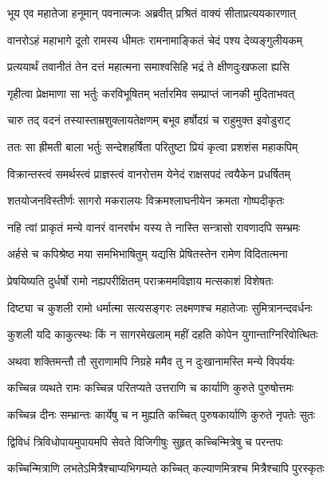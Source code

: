 
\twolineshloka
{भूय एव महातेजा हनूमान् पवनात्मजः}
{अब्रवीत् प्रश्रितं वाक्यं सीताप्रत्ययकारणात्} %

\twolineshloka
{वानरोऽहं महाभागे दूतो रामस्य धीमतः}
{रामनामाङ्कितं चेदं पश्य देव्यङ्गुलीयकम्} %

\twolineshloka
{प्रत्ययार्थं तवानीतं तेन दत्तं महात्मना}
{समाश्वसिहि भद्रं ते क्षीणदुःखफला ह्यसि} %

\twolineshloka
{गृहीत्वा प्रेक्षमाणा सा भर्तुः करविभूषितम्}
{भर्तारमिव सम्प्राप्तं जानकी मुदिताभवत्} %

\twolineshloka
{चारु तद् वदनं तस्यास्ताम्रशुक्लायतेक्षणम्}
{बभूव हर्षोदग्रं च राहुमुक्त इवोडुराट्} %

\twolineshloka
{ततः सा ह्रीमती बाला भर्तुः सन्देशहर्षिता}
{परितुष्टा प्रियं कृत्वा प्रशशंस महाकपिम्} %

\twolineshloka
{विक्रान्तस्त्वं समर्थस्त्वं प्राज्ञस्त्वं वानरोत्तम}
{येनेदं राक्षसपदं त्वयैकेन प्रधर्षितम्} %

\twolineshloka
{शतयोजनविस्तीर्णः सागरो मकरालयः}
{विक्रमश्लाघनीयेन क्रमता गोष्पदीकृतः} %

\twolineshloka
{नहि त्वां प्राकृतं मन्ये वानरं वानरर्षभ}
{यस्य ते नास्ति सन्त्रासो रावणादपि सम्भ्रमः} %

\twolineshloka
{अर्हसे च कपिश्रेष्ठ मया समभिभाषितुम्}
{यद्यसि प्रेषितस्तेन रामेण विदितात्मना} %

\twolineshloka
{प्रेषयिष्यति दुर्धर्षो रामो नह्यपरीक्षितम्}
{पराक्रममविज्ञाय मत्सकाशं विशेषतः} %

\twolineshloka
{दिष्ट्या च कुशली रामो धर्मात्मा सत्यसङ्गरः}
{लक्ष्मणश्च महातेजाः सुमित्रानन्दवर्धनः} %

\twolineshloka
{कुशली यदि काकुत्स्थः किं न सागरमेखलाम्}
{महीं दहति कोपेन युगान्ताग्निरिवोत्थितः} %

\twolineshloka
{अथवा शक्तिमन्तौ तौ सुराणामपि निग्रहे}
{ममैव तु न दुःखानामस्ति मन्ये विपर्ययः} %

\twolineshloka
{कच्चिन्न व्यथते रामः कच्चिन्न परितप्यते}
{उत्तराणि च कार्याणि कुरुते पुरुषोत्तमः} %

\twolineshloka
{कच्चिन्न दीनः सम्भ्रान्तः कार्येषु च न मुह्यति}
{कच्चित् पुरुषकार्याणि कुरुते नृपतेः सुतः} %

\twolineshloka
{द्विविधं त्रिविधोपायमुपायमपि सेवते}
{विजिगीषुः सुहृत् कच्चिन्मित्रेषु च परन्तपः} %

\twolineshloka
{कच्चिन्मित्राणि लभतेऽमित्रैश्चाप्यभिगम्यते}
{कच्चित् कल्याणमित्रश्च मित्रैश्चापि पुरस्कृतः} %

